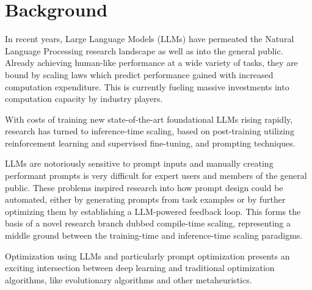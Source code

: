 \section{Background}
In recent years, Large Language Models (LLMs) have permeated the Natural Language Processing research landscape as well as into the general public. 
Already achieving human-like performance at a wide variety of tasks\cite{bubeck2023sparksartificialgeneralintelligence}, 
they are bound by scaling laws\cite{kaplan2020scalinglawsneurallanguage} which predict performance gained with increased computation expenditure.
This is currently fueling massive investments into computation capacity by industry players. 

With costs of training new state-of-the-art foundational LLMs rising rapidly, research has turned to inference-time scaling\cite{welleck2024decodingmetagenerationinferencetimealgorithms}, 
based on post-training\cite{openai2024openaio1card}\cite{deepseekai2025deepseekr1incentivizingreasoningcapability} utilizing reinforcement learning and supervised fine-tuning, and 
prompting techniques\cite{schulhoff2024promptreportsystematicsurvey}. 

LLMs are notoriously sensitive to prompt inputs\cite{zhuo2024prosaassessingunderstandingprompt}\cite{salinas2024butterflyeffectalteringprompts} and manually creating
performant prompts is very difficult\cite{10.1145/3544548.3581388} for expert users and members of the general public. These problems inspired research into how
prompt design could be automated, either by generating prompts from task examples\cite{honovich2022instructioninductionexamplesnatural} or by 
further optimizing them by establishing a LLM-powered feedback loop\cite{yang2024largelanguagemodelsoptimizers}\cite{zhou2023largelanguagemodelshumanlevel}\cite{he2024crispomultiaspectcritiquesuggestionguidedautomatic}. This forms the basis of a novel research branch dubbed compile-time scaling\cite{schnabel2024symbolicpromptprogramsearch},
representing a middle ground between the training-time and inference-time scaling paradigms.

Optimization using LLMs\cite{meyerson2024languagemodelcrossovervariation}\cite{liu2024largelanguagemodelsevolutionary} and particularly prompt optimization
presents an exciting intersection between deep learning and traditional optimization algorithms, like evolutionary algorithms\cite{guo2024connectinglargelanguagemodels}\cite{cui2024phaseevounifiedincontextprompt}\cite{fernando2023promptbreederselfreferentialselfimprovementprompt} and other metaheuristics\cite{pan2024plumpromptlearningusing}.

